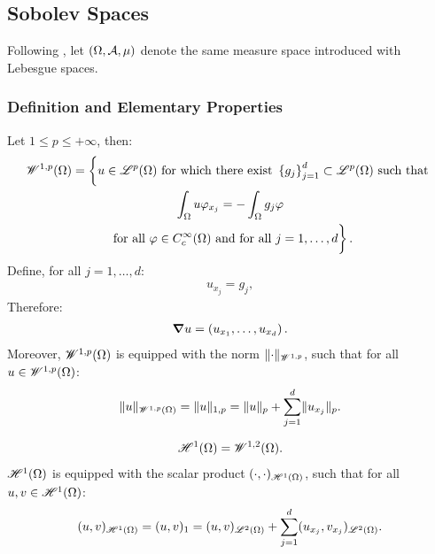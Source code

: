 \newpage
\subsection{Sobolev Spaces}

Following \cite[p. 267]{Brezis2010}, let $(\Omega, \mathcal{A}, \mu)$ denote the same measure space introduced with Lebesgue spaces.

\subsubsection{Definition and Elementary Properties}

\begin{definition}
    Let $1 \leq p \leq +\infty$, then:
    \begin{gather}
        \SpaceWkp{1}{p}(\Omega) = \left\{ \vphantom{\int_{\Omega}} u \in \SpaceLp{p}(\Omega) \text{ for which there exist } \left\{ g_j \right\}_{j = 1}^{d} \subset \SpaceLp{p}(\Omega) \text{ such that } \right. \notag \\ 
        \left. \int_{\Omega} u \varphi_{x_j} = - \int_{\Omega} g_j \varphi \right. \notag \\
        \left. \text{ for all } \varphi \in C_c^{\infty}(\Omega) \text{ and for all } j = 1, \dots, d \vphantom{\int_{\Omega}} \right\}.
    \end{gather}
    Define, for all $j = 1, \dots, d$:
    \begin{gather}
        u_{x_j} = g_j,
    \end{gather}
    Therefore:
    \begin{gather}
        \bm{\nabla} u = \left( u_{x_1}, \dots, u_{x_d} \right).
    \end{gather}
    Moreover, $\mathscr{W}^{1, p}(\Omega)$ is equipped with the norm $\lVert \cdot \rVert_{\mathscr{W}^{1, p}}$, such that for all $u \in \mathscr{W}^{1, p}(\Omega)$:
    \begin{gather}
        \lVert u \rVert_{\mathscr{W}^{1, p}(\Omega)} = \lVert u \rVert_{1, p} = \lVert u \rVert_p + \sum_{j = 1}^d \lVert u_{x_j} \rVert_p.
    \end{gather}
\end{definition}

\begin{definition}
    \begin{gather}
        \mathscr{H}^{1}(\Omega) = \mathscr{W}^{1, 2}(\Omega).
    \end{gather}
    $\mathscr{H}^{1}(\Omega)$ is equipped with the scalar product $(\cdot, \cdot)_{\mathscr{H}^{1}(\Omega)}$, such that for all $u, v \in \mathscr{H}^{1}(\Omega)$:
    \begin{gather}
        (u, v)_{\mathscr{H}^{1}(\Omega)} = (u, v)_1 = (u, v)_{\mathscr{L}^{2}(\Omega)} + \sum_{j = 1}^d (u_{x_j}, v_{x_j})_{\mathscr{L}^{2}(\Omega)}.
    \end{gather}
\end{definition}

